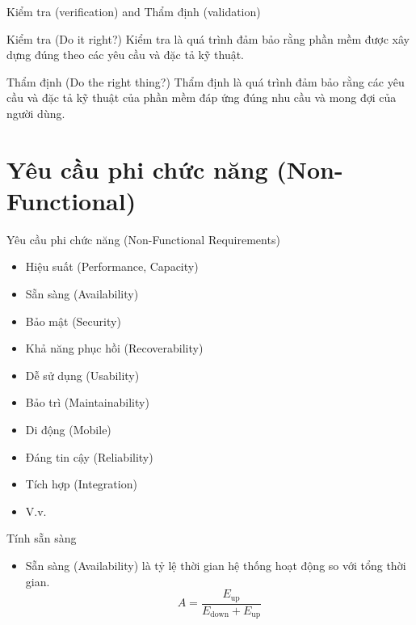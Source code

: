 \documentclass{beamer}
\begin{document}
\begin{frame}{Kiểm tra (verification) and Thẩm định (validation)}
    \begin{block}{Kiểm tra (Do it right?)}
        Kiểm tra là quá trình đảm bảo rằng phần mềm được
        xây dựng đúng theo các yêu cầu và đặc tả kỹ thuật.
    \end{block}
    \begin{block}{Thẩm định (Do the right thing?)}
        Thẩm định là quá trình đảm bảo rằng các yêu cầu và
        đặc tả kỹ thuật của phần mềm đáp ứng đúng nhu cầu và
        mong đợi của người dùng.
    \end{block}
\end{frame}

\section{Yêu cầu phi chức năng (Non-Functional)}

\begin{frame}{Yêu cầu phi chức năng (Non-Functional Requirements)}
    \begin{block}{}
        \begin{itemize}
            \item Hiệu suất (Performance, Capacity)
            \item Sẵn sàng (Availability)
            \item Bảo mật (Security)
            \item Khả năng phục hồi (Recoverability)
            \item Dễ sử dụng (Usability)
            \item Bảo trì (Maintainability)
            \item Di động (Mobile)
            \item Đáng tin cậy (Reliability)
            \item Tích hợp (Integration)
            \item V.v.
        \end{itemize}
    \end{block}
\end{frame}

\begin{frame}{Tính sẵn sàng}
    \begin{block}{}
        \begin{itemize}
            \item Sẵn sàng (Availability) là tỷ lệ thời gian hệ thống
            hoạt động so với tổng thời gian.
            \[A = \dfrac{E_\text{up}}{E_\text{down} + E_\text{up}}\]
        \end{itemize}
    \end{block}
\end{frame}
\end{document}
